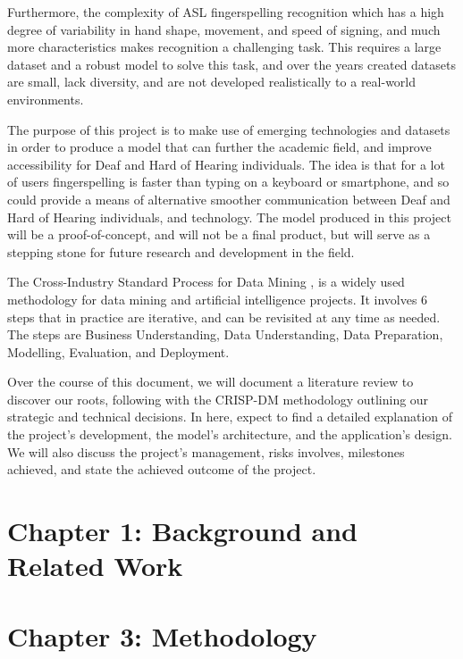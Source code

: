 \documentclass[preprint,11pt,review,authoryear]{elsarticle}
\begin{document}
Furthermore, the complexity of ASL fingerspelling recognition which has a high degree of variability in hand shape, movement, and speed of signing, and much more characteristics makes recognition a challenging task. This requires a large dataset and a robust model to solve this task, and over the years created datasets are small, lack diversity, and are not developed realistically to a real-world environments.

The purpose of this project is to make use of emerging technologies and datasets in order to produce a model that can further the academic field, and improve accessibility for Deaf and Hard of Hearing individuals. The idea is that for a lot of users fingerspelling is faster than typing on a keyboard or smartphone, and so could provide a means of alternative smoother communication between Deaf and Hard of Hearing individuals, and technology. The model produced in this project will be a proof-of-concept, and will not be a final product, but will serve as a stepping stone for future research and development in the field. 

The Cross-Industry Standard Process for Data Mining \cite{hotzWhatCRISPDM2018}, is a widely used methodology for data mining and artificial intelligence projects. It involves 6 steps that in practice are iterative, and can be revisited at any time as needed. The steps are Business Understanding, Data Understanding, Data Preparation, Modelling, Evaluation, and Deployment.

Over the course of this document, we will document a literature review to discover our roots, following with the CRISP-DM methodology outlining our strategic and technical decisions. In here, expect to find a detailed explanation of the project's development, the model's architecture, and the application's design. We will also discuss the project's management, risks involves, milestones achieved, and state the achieved outcome of the project.


\section{Chapter 1: Background and Related Work}

\section{Chapter 3: Methodology}
\end{document}
